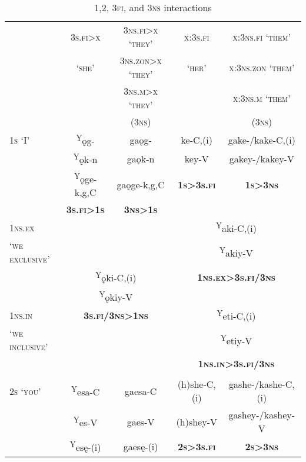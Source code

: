 \begin{table}
\caption{\textsc{1,2, 3fi}, and \textsc{3ns} interactions}
\label{figtab:1,2, 3fi, 3nsg interactions}

\small
\begin{tabular}{lcccc}
\lsptoprule
& \textsc{3s.fi>x} & \textsc{3ns.fi>x `they'} & \textsc{x}:\textsc{3s.fi} & \textsc{x}:\textsc{3ns.fi `them'}\\
& \textsc{`she'} & \textsc{3ns.zon>x `they'} & \textsc{`her'} & \textsc{x}:\textsc{3ns.zon `them'}\\
& & \textsc{3ns.m>x `they'} & & \textsc{x}:\textsc{3ns.m `them'} \\
& & \textsc{(3ns)} & & \textsc{(3ns)} \\
\midrule
\textsc{1s `I'} & \textsuperscript{Y}ǫg- & gaǫg-& ke-C,(i) & gake-/kake-C,(i) \\
& \textsuperscript{Y}ǫk-n & gaǫk-n & key-V & gakey-/kakey-V\\
& \textsuperscript{Y}ǫge-k,g,C & gaǫge-k,g,C & \textbf{\textsc{1s>3s.fi}} & \textbf{\textsc{1s>3ns}} \\
& \textbf{\textsc{3s.fi>1s}} & \textbf{\textsc{3ns>1s}} &  &  \\
\midrule
\textsc{1ns.ex} & & & \multicolumn{2}{c}{\textsuperscript{Y}aki-C,(i)}\\
\textsc{`we exclusive'} & & & \multicolumn{2}{c}{\textsuperscript{Y}akiy-V} \\
& \multicolumn{2}{c}{\textsuperscript{Y}ǫki-C,(i)} & \multicolumn{2}{c}{\textbf{\textsc{1ns.ex>3s.fi/3ns}}}\\
& \multicolumn{2}{c}{\textsuperscript{Y}ǫkiy-V} & \multicolumn{2}{c}{\textbf{\textsc{}}}\\
\cmidrule{1-1}\cmidrule{4-5}
\textsc{1ns.in} & \multicolumn{2}{c}{\textbf{\textsc{3s.fi/3ns>1ns}}} & \multicolumn{2}{c}{\textsuperscript{Y}eti-C,(i) }\\
\textsc{`we inclusive'} & \multicolumn{2}{c}{\textbf{\textsc{}}} & \multicolumn{2}{c}{\textsuperscript{Y}etiy-V}\\
 & & & \multicolumn{2}{c}{\textbf{\textsc{1ns.in>3s.fi/3ns}}}\\
 & & & \multicolumn{2}{c}{\textbf{\textsc{}}}\\
\midrule
\textsc{2s `you'} & \textsuperscript{Y}esa-C & gaesa-C & (h)she-C,(i) & gashe-/kashe-C,(i) \\
& \textsuperscript{Y}es-V & gaes-V & (h)shey-V & gashey-/kashey-V\\
& \textsuperscript{Y}esę-(i) & gaesę-(i)  & \textbf{{\textsc{2s>3s.fi}}} & \textbf{{\textsc{2s>3ns}}} \\

\end{tabular}
\end{table}
